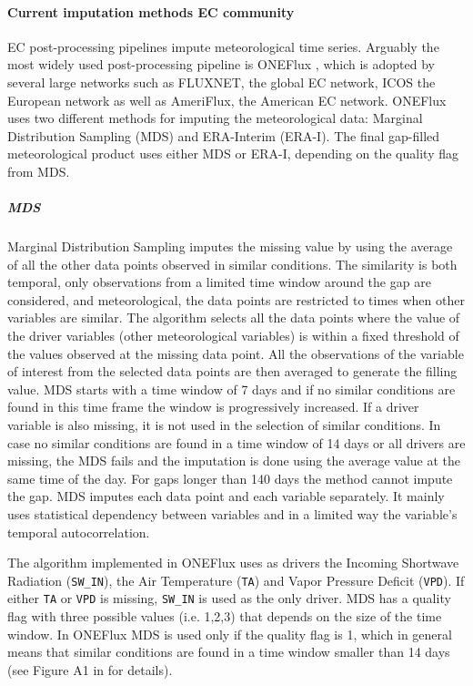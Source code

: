 \documentclass{article}
\begin{document}
\paragraph{Current imputation methods EC community} EC post-processing pipelines impute meteorological time series. Arguably the most widely used post-processing pipeline is \textsf{ONEFlux} \cite{pastorello_fluxnet2015_2020}, which is adopted by several large networks such as FLUXNET, the global EC network, ICOS the European network as well as AmeriFlux, the American EC network.
\textsf{ONEFlux} uses two different methods for imputing the meteorological data: Marginal Distribution Sampling (MDS) and ERA-Interim (ERA-I). The final gap-filled meteorological product uses either MDS or ERA-I, depending on the quality flag from MDS.
\subparagraph{MDS} Marginal Distribution Sampling \cite{reichstein_separation_2005-3} imputes the missing value by using the average of all the other data points observed in similar conditions. The similarity is both temporal, only observations from a limited time window around the gap are considered, and meteorological, the data points are restricted to times when other variables are similar.
The algorithm selects all the data points where the value of the driver variables (other meteorological variables) is within a fixed threshold of the values observed at the missing data point. All the observations of the variable of interest from the selected data points are then averaged to generate the filling value. MDS starts with a time window of 7 days and if no similar conditions are found in this time frame the window is progressively increased. If a driver variable is also missing, it is not used in the selection of similar conditions.
In case no similar conditions are found in a time window of 14 days or all drivers are missing, the MDS fails and the imputation is done using the average value at the same time of the day. For gaps longer than 140 days the method cannot impute the gap.
MDS imputes each data point and each variable separately. It mainly uses statistical dependency between variables and in a limited way the variable's temporal autocorrelation.

The algorithm implemented in \textsf{ONEFlux} uses as drivers the Incoming Shortwave Radiation (\texttt{SW\_IN}), the Air Temperature (\texttt{TA}) and Vapor Pressure Deficit (\texttt{VPD}). If either \texttt{TA} or \texttt{VPD} is missing, \texttt{SW\_IN} is used as the only driver.
MDS has a quality flag with three possible values (i.e. 1,2,3) that depends on the size of the time window. In \textsf{ONEFlux} MDS is used only if the quality flag is 1, which in general means that similar conditions are found in a time window smaller than 14 days (see Figure A1 in \textcite{reichstein_separation_2005-3} for details).
\end{document}
